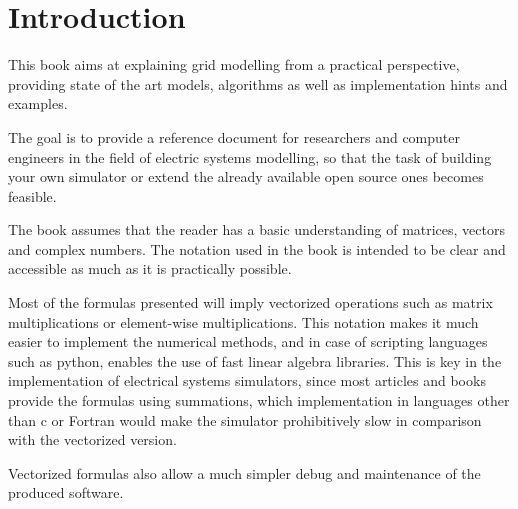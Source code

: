 \documentclass[a4paper,twoside]{tufte-book}
\begin{document}
\tableofcontents

\listoffigures

\listoftables


\mainmatter
\chapter{Introduction}

This book aims at explaining grid modelling from a practical perspective, providing state of the art models, algorithms as well as implementation hints and examples.

The goal is to provide a reference document for researchers and computer engineers in the field of electric systems modelling, so that the task of building your own simulator or extend the already available open source ones becomes feasible.

The book assumes that the reader has a basic understanding of matrices, vectors and complex numbers. The notation used in the book is intended to be clear and accessible as much as it is practically possible.

Most of the formulas presented will imply vectorized operations such as matrix multiplications or element-wise multiplications. This notation makes it much easier to implement the numerical methods, and in case of scripting languages such as python, enables the use of fast linear algebra libraries. This is key in the implementation of electrical systems simulators, since most articles and books provide the formulas using summations, which implementation in languages other than c or Fortran would make the simulator prohibitively slow in comparison with the vectorized version.

Vectorized formulas also allow a much simpler debug and maintenance of the produced software.


\end{document}

